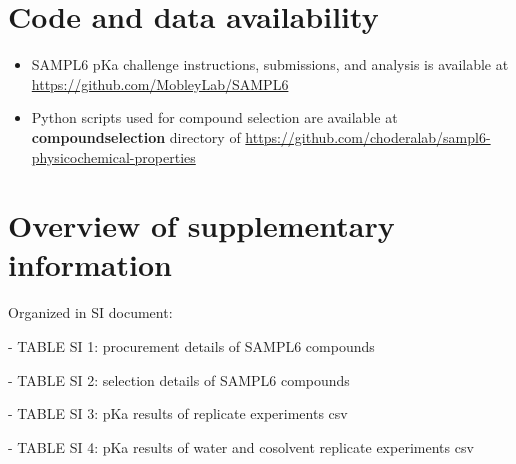 \documentclass[9pt,lineno]{elife}
\begin{document}
\section{Code and data availability}
\begin{minipage}{15cm}
\begin{itemize}

\item SAMPL6 pKa challenge instructions, submissions, and analysis is available at  \href{https://github.com/MobleyLab/SAMPL6}{https://github.com/MobleyLab/SAMPL6}

\item Python scripts used for compound selection are available at \textbf{compound\textunderscore selection} directory of  
\href{https://github.com/choderalab/sampl6\textendash physicochemical\textendash properties}{https://github.com/choderalab/sampl6-physicochemical-properties}

\end{itemize}
\end{minipage}



\section{Overview of supplementary information}

Organized in SI document:

- TABLE SI 1: procurement details of SAMPL6 compounds  

- TABLE SI 2: selection details of SAMPL6 compounds  

- TABLE SI 3: pKa results of replicate experiments csv

- TABLE SI 4: pKa results of water and cosolvent replicate experiments csv
\end{document}
